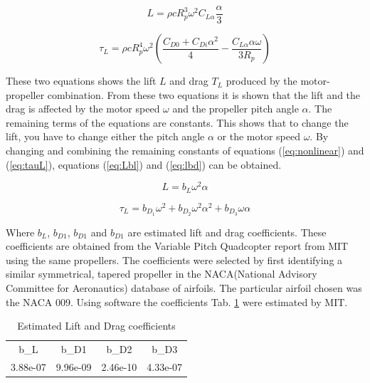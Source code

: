 \begin{equation}
    \label{eq:nonlinear}
    L = \rho cR_p^3\omega^2C_{L\alpha}\frac{\alpha}{3}
\end{equation}

\begin{equation}
    \label{eq:tauL}
    \tau_L =  \rho cR_p^4\omega^2\left(\frac{C_{D0} + C_{Di}\alpha^2}{4} - \frac{C_{L\alpha}\alpha\omega}{3R_p}\right)
\end{equation}\bigskip

These two equations shows the lift $L$ and drag $T_L$ produced by the motor-propeller combination. From these two equations it is shown that the lift and the drag is affected by the motor speed $\omega$ and the propeller pitch angle $\alpha$. The remaining terms of the equations are constants. This shows that to change the lift, you have to change either the pitch angle $\alpha$ or the motor speed $\omega$. By changing and combining the remaining constants of equations (\ref{eq:nonlinear}) and (\ref{eq:tauL}), equations (\ref{eq:Lbl}) and (\ref{eq:lbd}) can be obtained. 

\begin{equation}
    \label{eq:Lbl}
    L = b_L\omega^2\alpha
\end{equation}

\begin{equation}
    \label{eq:lbd}
    \tau_L = b_{D_1}\omega^2 + b_{D_2}\omega^2\alpha^2 + b_{D_3}\omega\alpha
\end{equation}\bigskip

Where $b_L$, $b_{D1}$, $b_{D1}$ and $b_{D1}$ are estimated lift and drag coefficients. These coefficients are obtained from the Variable Pitch Quadcopter report from MIT \cite{MITvpp} using the same propellers. The coefficients were selected by first identifying a similar symmetrical, tapered propeller in the NACA(National Advisory Committee for Aeronautics) database of airfoils. The particular airfoil chosen was the NACA 009. Using software the coefficients Tab. \ref{tab:EsLiDrCo} were estimated by MIT.

\begin{table}[H]
\caption{Estimated Lift and Drag coefficients}
\label{tab:EsLiDrCo}
\centering
    \begin{tabular}{ c c c c} 
    \hline
            b_L & b_{D1} & b_{D2} & b_{D3}\\
            3.88e-07  & 9.96e-09 & 2.46e-10 & 4.33e-07 \\
    \hline
    \end{tabular}
\end{table}

